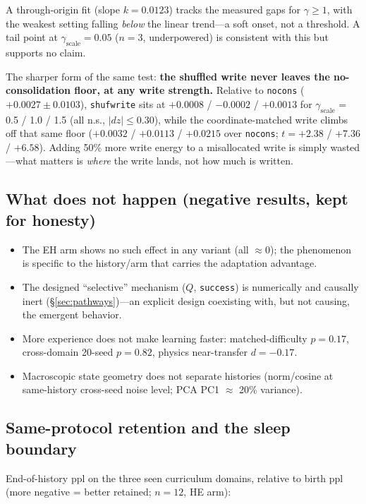 \documentclass{article} %
\begin{document}
A through-origin fit (slope $k{=}0.0123$) tracks the measured gaps for $\gamma \geq 1$, with the weakest setting falling \emph{below} the linear trend---a soft onset, not a threshold. A tail point at $\gamma_{\mathrm{scale}} = 0.05$ ($n{=}3$, underpowered) is consistent with this but supports no claim.

The sharper form of the same test: \textbf{the shuffled write never leaves the no-consolidation floor, at any write strength.} Relative to \texttt{nocons} ($+0.0027 \pm 0.0103$), \texttt{shufwrite} sits at $+0.0008$ / $-0.0002$ / $+0.0013$ for $\gamma_{\mathrm{scale}}$ = 0.5 / 1.0 / 1.5 (all n.s., $|dz| \leq 0.30$), while the coordinate-matched write climbs off that same floor ($+0.0032$ / $+0.0113$ / $+0.0215$ over \texttt{nocons}; $t = +2.38$ / $+7.36$ / $+6.58$). Adding 50\% more write energy to a misallocated write is simply wasted---what matters is \emph{where} the write lands, not how much is written.

\subsection{What does not happen (negative results, kept for honesty)}
\label{sec:negative}

\begin{itemize}
\item The EH arm shows no such effect in any variant (all $\approx 0$); the phenomenon is specific to the history/arm that carries the adaptation advantage.
\item The designed ``selective'' mechanism ($Q$, \texttt{success}) is numerically and causally inert (\S\ref{sec:pathways})---an explicit design coexisting with, but not causing, the emergent behavior.
\item More experience does not make learning faster: matched-difficulty $p{=}0.17$, cross-domain 20-seed $p{=}0.82$, physics near-transfer $d{=}{-}0.17$.
\item Macroscopic state geometry does not separate histories (norm/cosine at same-history cross-seed noise level; PCA PC1 $\approx$ 20\% variance).
\end{itemize}

\subsection{Same-protocol retention and the sleep boundary}
\label{sec:retention}

End-of-history ppl on the three seen curriculum domains, relative to birth ppl (more negative = better retained; $n{=}12$, HE arm):
\end{document}
